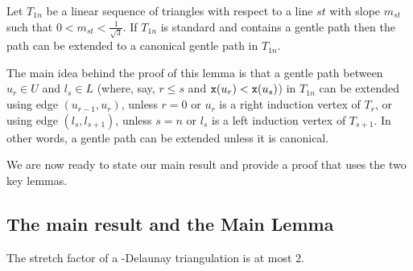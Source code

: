 \begin{lemma} 
\label{le:boundedGentelSections}
Let $T_{1n}$ be a linear sequence of triangles with respect to a line $st$ with
slope $m_{st}$ such that $0 < m_{st} < \frac{1}{\sqrt{3}}$. If $T_{1n}$ is
standard and contains a gentle path then the path can be extended
to a canonical gentle path in $T_{1n}$.
\end{lemma}
The main idea behind the proof of this lemma is that a gentle path between
$u_r \in U$ and $l_s \in L$ (where, say, $r \leq s$ and 
${\tt x}(u_r) < {\tt x}(u_s)$) in $T_{1n}$ can 
be extended using edge $(u_{r-1},u_r)$, unless $r=0$ or $u_r$ is a right
induction vertex of $T_{r}$, or using edge $(l_{s},l_{s+1})$, unless $s=n$ or
$l_s$ is a left induction vertex of $T_{s+1}$. In other words, a gentle path
can be extended unless it is canonical.

We are now ready to state our main result and provide a proof that uses
the two key lemmas.


\subsection{The main result and the Main Lemma}

\begin{theorem}
\label{th:main}
The stretch factor of a {\Large\varhexagon}-Delaunay triangulation is at most $2$.
\end{theorem}

